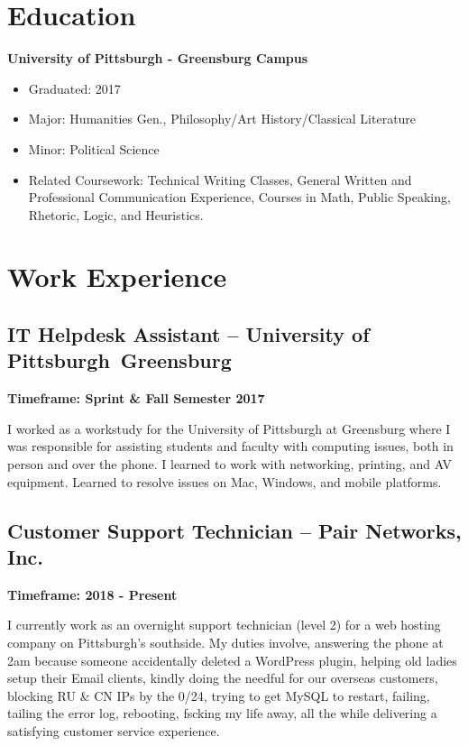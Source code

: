 \documentclass{article}
\begin{document}
\section{Education}

\textbf{University of Pittsburgh - Greensburg Campus}

\begin{itemize}
\item Graduated: 2017

\item Major: Humanities Gen., Philosophy/Art History/Classical Literature

\item Minor: Political Science

\item Related Coursework: Technical Writing Classes, General Written and Professional
Communication Experience, Courses in Math, Public Speaking, Rhetoric, Logic,
and Heuristics.
\end{itemize}

\section{Work Experience}

\subsection{IT Helpdesk Assistant -- University of Pittsburgh Greensburg}

\textbf{Timeframe: Sprint \& Fall Semester 2017}

I worked as a workstudy for the University of Pittsburgh at Greensburg where I
was responsible for assisting students and faculty with computing issues, both
in person and over the phone. I learned to work with networking, printing, and
AV equipment. Learned to resolve issues on Mac, Windows, and mobile platforms.

\subsection{Customer Support Technician -- Pair Networks, Inc.}

\textbf{Timeframe: 2018 - Present}

I currently work as an overnight support technician (level 2) for a web hosting
company on Pittsburgh's southside. My duties involve, answering the phone at
2am because someone accidentally deleted a WordPress plugin, helping old ladies
setup their Email clients, kindly doing the needful for our overseas customers,
blocking RU \& CN IPs by the 0/24, trying to get MySQL to restart, failing,
tailing the error log, rebooting, fscking my life away, all the while
delivering a satisfying customer service experience.
\end{document}
